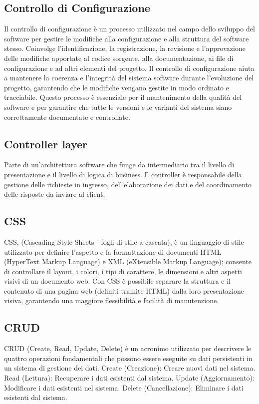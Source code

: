 \subsection*{Controllo di Configurazione} 
Il controllo di configurazione è un processo utilizzato nel campo dello sviluppo del software per gestire le modifiche alla configurazione e alla struttura del software stesso. Coinvolge l'identificazione, la registrazione, la revisione e l'approvazione delle modifiche apportate al codice sorgente, alla documentazione, ai file di configurazione e ad altri elementi del progetto. Il controllo di configurazione aiuta a mantenere la coerenza e l'integrità del sistema software durante l'evoluzione del progetto, garantendo che le modifiche vengano gestite in modo ordinato e tracciabile. Questo processo è essenziale per il mantenimento della qualità del software e per garantire che tutte le versioni e le varianti del sistema siano correttamente documentate e controllate.
\subsection*{Controller layer} 
Parte di un'architettura software che funge da intermediario tra il livello di presentazione e il livello di logica di business. Il controller è responsabile della gestione delle richieste in ingresso, dell'elaborazione dei dati e del coordinamento delle risposte da inviare al client.
\subsection*{CSS} 
CSS, (Cascading Style Sheets - fogli di stile a cascata), è un linguaggio di stile utilizzato per definire l'aspetto e la formattazione di documenti HTML (HyperText Markup Language) e XML (eXtensible Markup Language); consente di controllare il layout, i colori, i tipi di carattere, le dimensioni e altri aspetti visivi di un documento web. Con CSS è possibile separare la struttura e il contenuto di una pagina web (definiti tramite HTML) dalla loro presentazione visiva, garantendo una maggiore flessibilità e facilità di manutenzione.
\subsection*{CRUD} 
CRUD (Create, Read, Update, Delete) è un acronimo utilizzato per descrivere le quattro operazioni fondamentali che possono essere eseguite su dati persistenti in un sistema di gestione dei dati. Create (Creazione): Creare nuovi dati nel sistema. Read (Lettura): Recuperare i dati esistenti dal sistema. Update (Aggiornamento): Modificare i dati esistenti nel sistema. Delete (Cancellazione): Eliminare i dati esistenti dal sistema.
